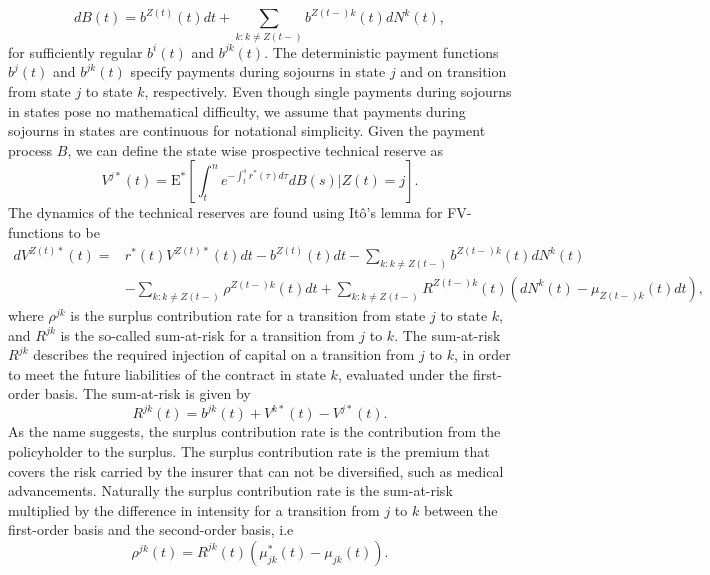 \documentclass[12pt]{article}
\newcommand{\E}{\text{E}}
\theoremstyle{my_thm}
\begin{document}
$$
dB(t)=b^{Z(t)}(t) dt +\sum_{k:k \neq Z(t-)} b^{Z(t-)k}(t)dN^k(t),
$$
for sufficiently regular $b^i(t)$ and $b^{jk}(t)$. The deterministic payment functions $b^j(t)$ and $b^{jk}(t)$ specify payments during sojourns in state $j$ and on transition from state $j$ to state $k$, respectively. Even though single payments during sojourns in states pose no mathematical difficulty, we assume that payments during sojourns in states are continuous for notational simplicity. Given the payment process $B$, we can define the state wise prospective technical reserve as
$$
V^{j*}(t)=\E^*\left[ \int_t^n  e^{-\int_t^s r^*(\tau) d\tau} dB(s) |Z(t)=j \right].
$$
The dynamics of the technical reserves are found using Itô's lemma for FV-functions to be
\begin{align}
dV^{Z(t)*}(t)=&r^*(t)V^{Z(t)*}(t)dt - b^{Z(t)}(t)dt -\sum_{k:k\neq Z(t-)}b^{Z(t-)k}(t) dN^k(t)\nonumber
\\
&-\sum_{k:k\neq Z(t-)} \rho^{Z(t-)k}(t) dt
+
\sum_{k:k\neq Z(t-)} R^{Z(t-)k}(t)(dN^k(t)-\mu_{Z(t-)k}(t) dt), \label{eq:AAP}
\end{align}
where $\rho^{jk}$ is the surplus contribution rate for a transition from state $j$ to state $k$, and $R^{jk}$ is the so-called sum-at-risk for a transition from $j$ to $k$. The sum-at-risk $R^{jk}$ describes the required injection of capital on a transition from $j$ to $k$, in order to meet the future liabilities of the contract in state $k$, evaluated under the first-order basis. The sum-at-risk is given by
$$
R^{jk}(t)=b^{jk}(t)+V^{k*}(t)-V^{j*}(t).
$$
As the name suggests, the surplus contribution rate is the contribution from the policyholder to the surplus. The surplus contribution rate is the premium that covers the risk carried by the insurer that can not be diversified, such as medical advancements. Naturally the surplus contribution rate is the sum-at-risk multiplied by the difference in intensity for a transition from $j$ to $k$ between the first-order basis and the second-order basis, i.e
$$
\rho^{jk}(t)=R^{jk}(t)(\mu^*_{jk}(t)-\mu_{jk}(t)).
$$
\end{document}
